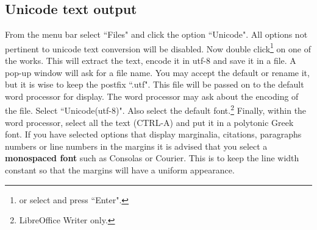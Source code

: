 \documentclass[11pt,a4paper]{article}
\begin{document}
  \subsection{Unicode text output}From the menu bar select ``Files"
    and click the option ``Unicode". All options not pertinent to unicode
    text conversion will be disabled.
    Now double click\footnote{or select and press ``Enter".} on one of the works.
    This will extract the text, encode it in utf-8 and save it in a file.
    A pop-up window will ask for a file name. You may accept the default or rename
    it, but it is wise to keep the postfix ``.utf".
    This file will be passed on to the default word processor for display.
    The word processor may ask about the encoding of the file.  Select
    ``Unicode(utf-8)". Also select the default font.\footnote{LibreOffice Writer only.}
    Finally, within the word processor, select all the text (CTRL-A) and put
    it in a polytonic Greek font.  If you have selected options that display marginalia,
    citations, paragraphs  numbers or line numbers in the margins it is advised that you
    select a {\bf monospaced font} such as Consolas or Courier.
    This is to keep the line width constant so that the margins will have a uniform
    appearance.
\end{document}
